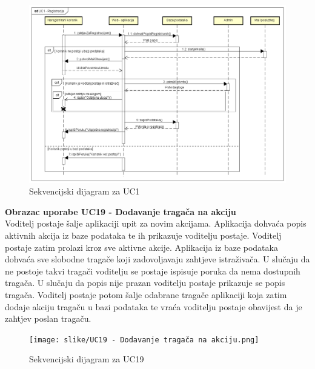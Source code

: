 				
				
				\begin{figure}[H]
					\includegraphics[scale=0.5]{slike/UC1 - Registracija.png} %
					\centering
					\caption{Sekvencijski dijagram za UC1}
					\label{fig:UC1 - Registracija}
				\end{figure}

				\eject

				\noindent
				\textbf{Obrazac uporabe UC19 - Dodavanje tragača na akciju}\\

				\noindent
				Voditelj postaje šalje aplikaciji upit za novim akcijama.
        			Aplikacija dohvaća popis aktivnih akcija iz baze podataka te ih prikazuje voditelju postaje.
        			Voditelj postaje zatim prolazi kroz sve aktivne akcije.
        			Aplikacija iz baze podataka dohvaća sve slobodne tragače koji zadovoljavaju zahtjeve istraživača.
        			U slučaju da ne postoje takvi tragači voditelju se postaje ispisuje poruka da nema dostupnih tragača.
        			U slučaju da popis nije prazan voditelju postaje prikazuje se popis tragača.
        			Voditelj postaje potom šalje odabrane tragače aplikaciji koja zatim dodaje akciju tragaču u bazi podataka te
        			vraća voditelju postaje obavijest da je zahtjev poslan tragaču.

				

				\begin{figure}[H]
					\texttt{[image: slike/UC19 - Dodavanje tragača na akciju.png]} %
					\centering
					\caption{Sekvencijski dijagram za UC19}
					\label{fig:UC19 - Dodavanje tragača na akciju}
				\end{figure}
	
